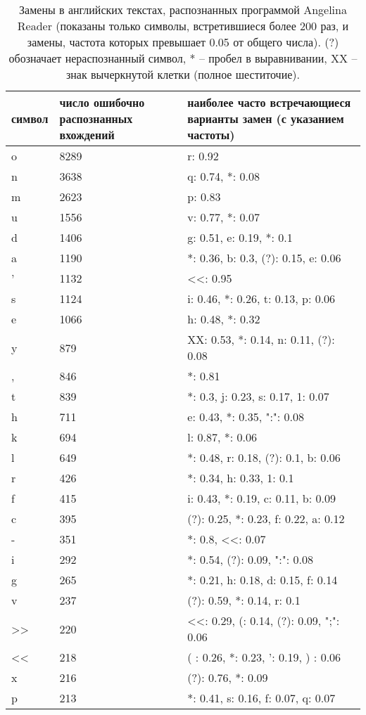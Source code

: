 \documentclass{main.tex}[subfiles]
\begin{document}
\newpage
{}

\begin{table}[H]
    \centering
    \caption{Замены в английских текстах, распознанных программой Angelina Reader (показаны только символы, встретившиеся более 200 раз, и замены, частота которых превышает 0.05 от общего числа). (?) обозначает нераспознанный символ, * -- пробел в выравнивании, XX -- знак вычеркнутой клетки (полное шеститочие).}
    \begin{tabular}{l p{} p{}}
        \hline
        символ & число ошибочно распознанных вхождений & наиболее часто встречающиеся варианты замен (с указанием частоты) \\
        \hline
        o & 8289 & r: 0.92 \\
        n & 3638 & q: 0.74, *: 0.08 \\
        m & 2623 & p: 0.83 \\
        u & 1556 & v: 0.77, *: 0.07 \\
        d & 1406 & g: 0.51, e: 0.19, *: 0.1 \\
        a & 1190 & *: 0.36, b: 0.3, (?): 0.15, e: 0.06 \\
        ' & 1132 & <<: 0.95 \\
        s & 1124 & i: 0.46, *: 0.26, t: 0.13, p: 0.06 \\
        e & 1066 & h: 0.48, *: 0.32 \\
        y & 879 & XX: 0.53, *: 0.14, n: 0.11, (?): 0.08 \\
        , & 846 & *: 0.81 \\
        t & 839 & *: 0.3, j: 0.23, s: 0.17, 1: 0.07 \\
        h & 711 & e: 0.43, *: 0.35, ":": 0.08 \\
        k & 694 & l: 0.87, *: 0.06 \\
        l & 649 & *: 0.48, r: 0.18, (?): 0.1, b: 0.06 \\
        r & 426 & *: 0.34, h: 0.33, 1: 0.1 \\
        f & 415 & i: 0.43, *: 0.19, c: 0.11, b: 0.09 \\
        c & 395 & (?): 0.25, *: 0.23, f: 0.22, a: 0.12 \\
        - & 351 & *: 0.8, <<: 0.07 \\
        i & 292 & *: 0.54, (?): 0.09, ":": 0.08 \\
        g & 265 & *: 0.21, h: 0.18, d: 0.15, f: 0.14 \\
        v & 237 & (?): 0.59, *: 0.14, r: 0.1 \\
        >> & 220 & <<: 0.29, (: 0.14, (?): 0.09, ";": 0.06 \\
        << & 218 & ( : 0.26, *: 0.23, ': 0.19, ) : 0.06 \\
        x & 216 & (?): 0.76, *: 0.09 \\
        p & 213 & *: 0.41, s: 0.16, f: 0.07, q: 0.07 \\
        \hline
    \end{tabular}
    \label{table:per_letter_errs}
\end{table}


%
\end{document}
